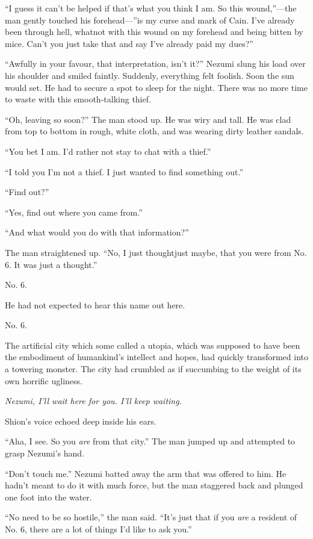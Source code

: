 ``I guess it can't be helped if that's what you think I am. So this
wound,''---the man gently touched his forehead---''is my curse and mark of
Cain. I've already been through hell, whatnot with this wound on my
forehead and being bitten by mice. Can't you just take that and say I've
already paid my dues?''

``Awfully in your favour, that interpretation, isn't it?'' Nezumi slung
his load over his shoulder and smiled faintly. Suddenly, everything felt
foolish. Soon the sun would set. He had to secure a spot to sleep for
the night. There was no more time to waste with this smooth-talking
thief.

``Oh, leaving so soon?'' The man stood up. He was wiry and tall. He was
clad from top to bottom in rough, white cloth, and was wearing dirty
leather sandals.

``You bet I am. I'd rather not stay to chat with a thief.''

``I told you I'm not a thief. I just wanted to find something out.''

``Find out?''

``Yes, find out where you came from.''

``And what would you do with that information?''

The man straightened up. ``No, I just thought\el just maybe, that you
were from No. 6. It was just a thought.''

No. 6.

He had not expected to hear this name out here.

No. 6.

The artificial city which some called a utopia, which was supposed to
have been the embodiment of humankind's intellect and hopes, had quickly
transformed into a towering monster. The city had crumbled as if
succumbing to the weight of its own horrific ugliness.

\emph{Nezumi, I'll wait here for you. I'll keep waiting.}

Shion's voice echoed deep inside his ears.

``Aha, I see. So you \emph{are} from that city.'' The man jumped up and
attempted to grasp Nezumi's hand.

``Don't touch me.'' Nezumi batted away the arm that was offered to him.
He hadn't meant to do it with much force, but the man staggered back and
plunged one foot into the water.

``No need to be so hostile,'' the man said. ``It's just that if you \emph{are}
a resident of No. 6, there are a lot of things I'd like to ask you.''

